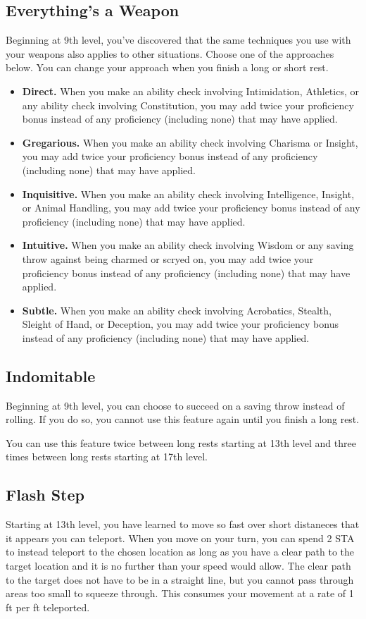 \subsection{Everything's a Weapon}
Beginning at 9th level, you've discovered that the same techniques you use with your weapons also applies to other situations. Choose one of the approaches below. You can change your approach when you finish a long or short rest.

\begin{itemize}
	\item \textbf{Direct.} When you make an ability check involving Intimidation, Athletics, or any ability check involving Constitution, you may add twice your proficiency bonus instead of any proficiency (including none) that may have applied.
	\item \textbf{Gregarious.} When you make an ability check involving Charisma or Insight, you may add twice your proficiency bonus instead of any proficiency (including none) that may have applied.
	\item \textbf{Inquisitive.} When you make an ability check involving Intelligence, Insight, or Animal Handling, you may add twice your proficiency bonus instead of any proficiency (including none) that may have applied.
	\item \textbf{Intuitive.} When you make an ability check involving Wisdom or any saving throw against being charmed or scryed on, you may add twice your proficiency bonus instead of any proficiency (including none) that may have applied.
	\item \textbf{Subtle.} When you make an ability check involving Acrobatics, Stealth, Sleight of Hand, or Deception, you may add twice your proficiency bonus instead of any proficiency (including none) that may have applied.
\end{itemize}

\subsection{Indomitable}

Beginning at 9th level, you can choose to succeed on a saving throw instead of rolling. If you do so, you cannot use this feature again until you finish a long rest.

You can use this feature twice between long rests starting at 13th level and three times between long rests starting at 17th level.

\subsection{Flash Step}
Starting at 13th level, you have learned to move so fast over short distaneces that it appears you can teleport. When you move on your turn, you can spend 2 STA to instead teleport to the chosen location as long as you have a clear path to the target location and it is no further than your speed would allow. The clear path to the target does not have to be in a straight line, but you cannot pass through areas too small to squeeze through. This consumes your movement at a rate of 1 ft per ft teleported.

